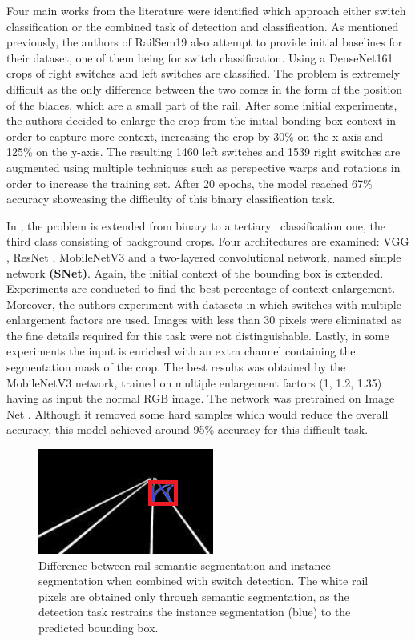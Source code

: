\documentclass[conference]{IEEEtran}
\begin{document}
Four main works from the literature were identified which approach either switch classification or the combined task of detection and classification. As mentioned previously, the authors of RailSem19 also attempt to provide initial baselines for their dataset, one of them being for switch classification. Using a DenseNet161 \cite{huang2017densely} crops of right switches and left switches are classified. The problem is extremely difficult as the only difference between the two comes in the form of the position of the blades, which are a small part of the rail. After some initial experiments, the authors decided to enlarge the crop from the initial bonding box context in order to capture more context, increasing the crop by 30\% on the x-axis and 125\% on the y-axis. The resulting 1460 left switches and 1539 right switches are augmented using multiple techniques such as perspective warps and rotations in order to increase the training set. After 20 epochs, the model reached 67\% accuracy showcasing the difficulty of this binary classification task.

In \cite{switch_classification}, the problem is extended from binary to a tertiary \ classification one, the third  class consisting of background crops. Four architectures are examined: VGG \cite{simonyan2014very}, ResNet \cite{he2016deep}, MobileNetV3 \cite{howard2019searching} and a two-layered convolutional network, named simple network \textbf{(SNet)}. Again, the initial context of the bounding box is extended. Experiments are conducted to find the best percentage of context enlargement. Moreover, the authors experiment with datasets in which switches with multiple enlargement factors are used. Images with less than 30 pixels were eliminated as the fine details required for this task were not distinguishable. Lastly, in some experiments the input is enriched with an extra channel containing the segmentation mask of the crop. The best results was obtained by the MobileNetV3 network, trained on multiple enlargement factors (1, 1.2, 1.35) having as input the normal RGB image. The network was pretrained on Image Net \cite{deng2009imagenet}. Although it removed some hard samples which would reduce the overall accuracy, this model achieved around 95\% accuracy for this difficult task. 


\begin{figure}[htb]
    \centering
	\centerline{\includegraphics[scale=1.6]{figures/seminst.png}}
	\caption{Difference between rail semantic segmentation and instance segmentation when combined with switch detection. The white rail pixels are obtained only through semantic segmentation, as the detection task restrains the instance segmentation (blue) to the predicted bounding box.}
	\label{fig:semantic_vs_instance}
\end{figure}
\end{document}
